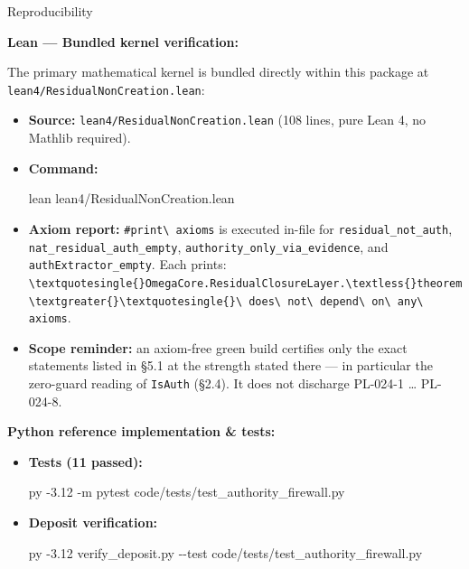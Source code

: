 \documentclass[
  10pt,
]{article}
\newenvironment{Shaded}{}{}
\newcommand{\AttributeTok}[1]{\textcolor[rgb]{0.49,0.56,0.16}{#1}}
\newcommand{\ExtensionTok}[1]{#1}
\newcommand{\NormalTok}[1]{#1}
\DeclareRobustCommand{\texttt}[1]{{\paperSymbolFont\nolinkurl{#1}}}
\begin{document}
Reproducibility

\textbf{Lean --- Bundled kernel verification:}

The primary mathematical kernel is bundled directly within this package at \texttt{lean4/ResidualNonCreation.lean}:

\begin{itemize}
\item
  \textbf{Source:} \texttt{lean4/ResidualNonCreation.lean} (108 lines, pure Lean 4, no Mathlib required).
\item
  \textbf{Command:}

\begin{Shaded}
\begin{Highlighting}[]
\ExtensionTok{lean}\NormalTok{ lean4/ResidualNonCreation.lean}
\end{Highlighting}
\end{Shaded}
\item
  \textbf{Axiom report:} \texttt{\#print\ axioms} is executed in-file for \texttt{residual\_not\_auth}, \texttt{nat\_residual\_auth\_empty}, \texttt{authority\_only\_via\_evidence}, and \texttt{authExtractor\_empty}. Each prints: \texttt{\textquotesingle{}OmegaCore.ResidualClosureLayer.\textless{}theorem\textgreater{}\textquotesingle{}\ does\ not\ depend\ on\ any\ axioms}.
\item
  \textbf{Scope reminder:} an axiom-free green build certifies only the exact statements listed in §5.1 at the strength stated there --- in particular the zero-guard reading of \texttt{IsAuth} (§2.4). It does not discharge PL-024-1 \ldots{} PL-024-8.
\end{itemize}

\textbf{Python reference implementation \& tests:}

\begin{itemize}
\item
  \textbf{Tests (11 passed):}

\begin{Shaded}
\begin{Highlighting}[]
\ExtensionTok{py} \AttributeTok{{-}3.12} \AttributeTok{{-}m}\NormalTok{ pytest code/tests/test\_authority\_firewall.py}
\end{Highlighting}
\end{Shaded}
\item
  \textbf{Deposit verification:}

\begin{Shaded}
\begin{Highlighting}[]
\ExtensionTok{py} \AttributeTok{{-}3.12}\NormalTok{ verify\_deposit.py }\AttributeTok{{-}{-}test}\NormalTok{ code/tests/test\_authority\_firewall.py}
\end{Highlighting}
\end{Shaded}
\end{itemize}
\end{document}
